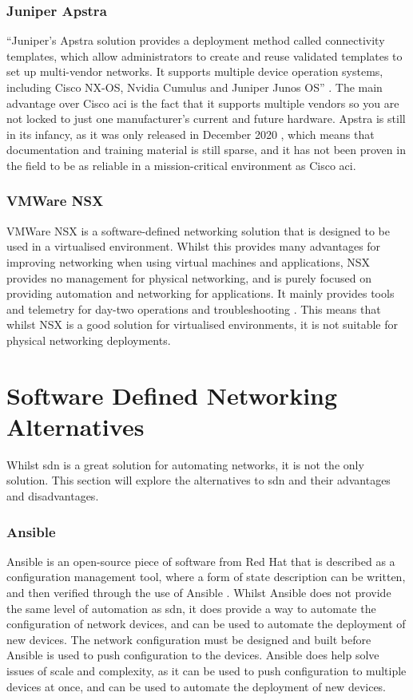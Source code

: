 \subsubsection{Juniper Apstra}
``Juniper’s Apstra solution provides
a
deployment method called connectivity templates, which allow administrators to
create and reuse validated templates to set up multi-vendor networks. It
supports multiple device operation systems, including Cisco NX-OS, Nvidia
Cumulus and Juniper Junos OS'' \citep{9914530}. The main advantage over Cisco
\gls{aci} is the fact that it supports multiple vendors so you are not locked
to just one manufacturer's current and future hardware. Apstra is still in its
infancy, as it was only released in December 2020 \citep{9914530}, which means
that documentation and training material is still sparse, and it has not been
proven in the field to be as reliable in a mission-critical environment as
Cisco \gls{aci}.

\subsubsection{VMWare NSX}
VMWare NSX is a software-defined
networking solution that is designed to be used in a virtualised environment.
Whilst this provides many advantages for improving networking when using
virtual machines and applications, NSX provides no management for physical
networking, and is purely focused on providing automation and networking for
applications. It mainly provides tools and telemetry for day-two operations and
troubleshooting \citep{2}. This means that whilst NSX is a good solution for
virtualised environments, it is not suitable for physical networking
deployments.

\section{Software Defined Networking Alternatives}
\label{litreview:alternatives}
Whilst \gls{sdn} is a great
solution for
automating networks, it is not the only solution. This section
will explore the
alternatives to \gls{sdn} and their advantages and
disadvantages.
\subsubsection{Ansible}
Ansible is an open-source piece of software from Red Hat that is described as a configuration management tool, where a form of state description can be written, and then verified through the use of Ansible \citep{powerofansible}. Whilst Ansible does not provide the same level of automation as \gls{sdn}, it does provide a way to automate the configuration of network devices, and can be used to automate the deployment of new devices. The network configuration must be designed and built before Ansible is used to push configuration to the devices. Ansible does help solve issues of scale and complexity, as it can be used to push configuration to multiple devices at once, and can be used to automate the deployment of new devices.

